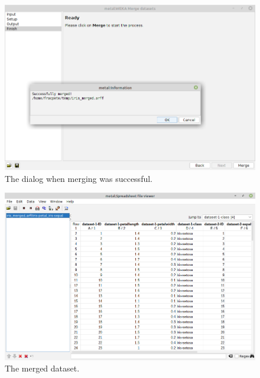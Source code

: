 \begin{figure}[htb]
  \centering
  \includegraphics[width=12.0cm]{images/merge_datasets4.png}
  \caption{The dialog when merging was successful.}
  \label{merge_datasets4}
\end{figure}

\begin{figure}[htb]
  \centering
  \includegraphics[width=12.0cm]{images/merge_datasets-output.png}
  \caption{The merged dataset.}
  \label{merge_datasets-output}
\end{figure}
